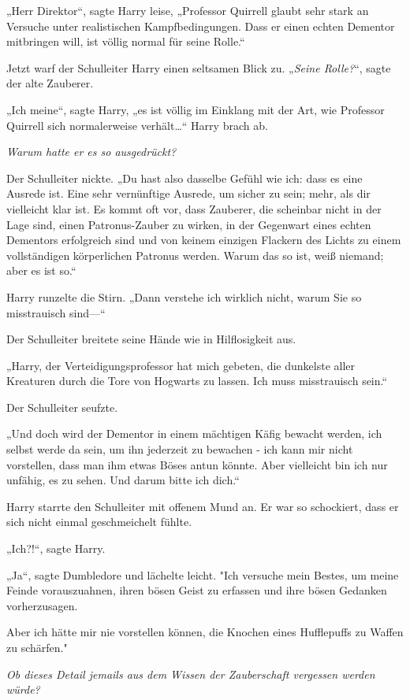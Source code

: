 {„Herr Direktor“, sagte Harry leise, „Professor Quirrell glaubt sehr stark an Versuche unter realistischen Kampfbedingungen. Dass er einen echten Dementor mitbringen will, ist völlig normal für seine Rolle.“

Jetzt warf der Schulleiter Harry einen seltsamen Blick zu. „\emph{Seine Rolle?}“, sagte der alte Zauberer.

„Ich meine“, sagte Harry, „es ist völlig im Einklang mit der Art, wie Professor Quirrell sich normalerweise verhält…“ Harry brach ab.

\emph{Warum hatte er es so ausgedrückt?}

Der Schulleiter nickte. „Du hast also dasselbe Gefühl wie ich: dass es eine Ausrede ist. Eine sehr vernünftige Ausrede, um sicher zu sein; mehr, als dir vielleicht klar ist. Es kommt oft vor, dass Zauberer, die scheinbar nicht in der Lage sind, einen Patronus-Zauber zu wirken, in der Gegenwart eines echten Dementors erfolgreich sind und von keinem einzigen Flackern des Lichts zu einem vollständigen körperlichen Patronus werden. Warum das so ist, weiß niemand; aber es ist so.“

Harry runzelte die Stirn. „Dann verstehe ich wirklich nicht, warum Sie so misstrauisch sind—“

Der Schulleiter breitete seine Hände wie in Hilflosigkeit aus.

„Harry, der Verteidigungsprofessor hat mich gebeten, die dunkelste aller Kreaturen durch die Tore von Hogwarts zu lassen. Ich muss misstrauisch sein.“

Der Schulleiter seufzte.

„Und doch wird der Dementor in einem mächtigen Käfig bewacht werden, ich selbst werde da sein, um ihn jederzeit zu bewachen - ich kann mir nicht vorstellen, dass man ihm etwas Böses antun könnte. Aber vielleicht bin ich nur unfähig, es zu sehen. Und darum bitte ich dich.“

Harry starrte den Schulleiter mit offenem Mund an. Er war so schockiert, dass er sich nicht einmal geschmeichelt fühlte.

„Ich?!“, sagte Harry.

„Ja“, sagte Dumbledore und lächelte leicht. "Ich versuche mein Bestes, um meine Feinde vorauszuahnen, ihren bösen Geist zu erfassen und ihre bösen Gedanken vorherzusagen.

Aber ich hätte mir nie vorstellen können, die Knochen eines Hufflepuffs zu Waffen zu schärfen."

\emph{Ob dieses Detail jemails aus dem Wissen der Zauberschaft vergessen werden würde?}

}
